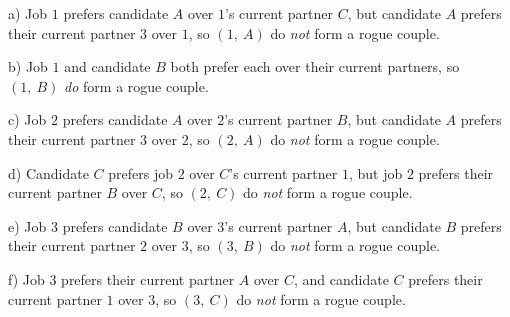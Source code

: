 \documentclass[11pt, preview]{standalone} %
\begin{document}
\begin{enumerate}
\begin{Multi}
\begin{enumerate}
a) Job $1$ prefers candidate $A$ over $1$'s current partner $C$, but candidate $A$ prefers their current partner $3$ over $1$, so $(1,\ A)$ do {\it not} form a rogue couple.

b) Job $1$ and candidate $B$ both prefer each over their current partners, so $(1,\ B)$ {\it do} form a rogue couple.

c) Job $2$ prefers candidate $A$ over $2$'s current partner $B$, but candidate $A$ prefers their current partner $3$ over $2$, so $(2,\ A)$ do {\it not} form a rogue couple.

d) Candidate $C$ prefers job $2$ over $C$'s current partner $1$, but job $2$ prefers their current partner $B$ over $C$, so $(2,\ C)$ do {\it not} form a rogue couple.

e) Job $3$ prefers candidate $B$ over $3$'s current partner $A$, but candidate $B$ prefers their current partner $2$ over $3$, so $(3,\ B)$ do {\it not} form a rogue couple.

f) Job $3$ prefers their current partner $A$ over $C$, and candidate $C$ prefers their current partner $1$ over $3$, so $(3,\ C)$ do {\it not} form a rogue couple.
 

\end{enumerate}
\end{Multi}
\end{enumerate}
\end{document}
